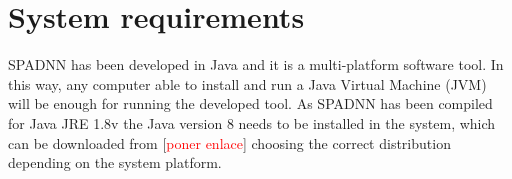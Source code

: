 
\chapter{System requirements}

	\begin{onehalfspace}
	
		SPADNN has been developed in Java and it is a multi-platform software tool. In this way, any computer able to install and run a Java Virtual Machine (JVM) will be enough for running the developed tool. As SPADNN has been compiled for Java JRE 1.8v the Java version 8 needs to be installed in the system, which can be downloaded from [\textcolor{red}{poner enlace}] choosing the correct distribution depending on the system platform.
	
	\end{onehalfspace}
